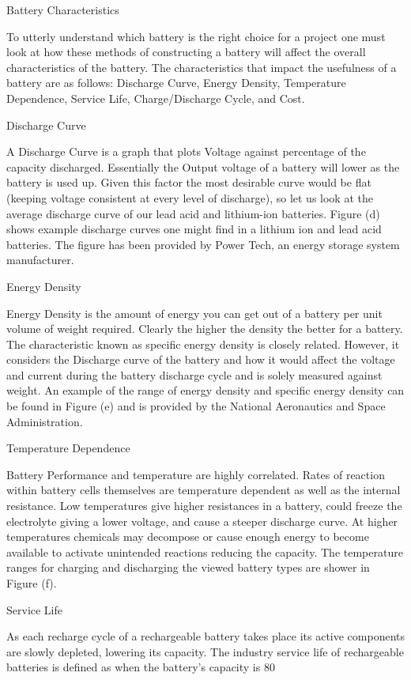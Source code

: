 Battery Characteristics 

To utterly understand which battery is the right choice for a project one must look at how these methods of constructing a battery will affect the overall characteristics of the battery. The characteristics that impact the usefulness of a battery are as follows: Discharge Curve, Energy Density, Temperature Dependence, Service Life, Charge/Discharge Cycle, and Cost.

Discharge Curve 

A Discharge Curve is a graph that plots Voltage against percentage of the capacity discharged. Essentially the Output voltage of a battery will lower as the battery is used up. Given this factor the most desirable curve would be flat (keeping voltage consistent at every level of discharge), so let us look at the average discharge curve of our lead acid and lithium-ion batteries. Figure (d) shows example discharge curves one might find in a lithium ion and lead acid batteries. The figure has been provided by Power Tech, an energy storage system manufacturer. 

Energy Density 

Energy Density is the amount of energy you can get out of a battery per unit volume of weight required. Clearly the higher the density the better for a battery. The characteristic known as specific energy density is closely related. However, it considers the Discharge curve of the battery and how it would affect the voltage and current during the battery discharge cycle and is solely measured against weight. An example of the range of energy density and specific energy density can be found in Figure (e) and is provided by the National Aeronautics and Space Administration.

Temperature Dependence 

Battery Performance and temperature are highly correlated. Rates of reaction within battery cells themselves are temperature dependent as well as the internal resistance. Low temperatures give higher resistances in a battery, could freeze the electrolyte giving a lower voltage, and cause a steeper discharge curve. At higher temperatures chemicals may decompose or cause enough energy to become available to activate unintended reactions reducing the capacity. The temperature ranges for charging and discharging the viewed battery types are shower in Figure (f). 

Service Life 

As each recharge cycle of a rechargeable battery takes place its active components are slowly depleted, lowering its capacity. The industry service life of rechargeable batteries is defined as when the battery's capacity is 80%

